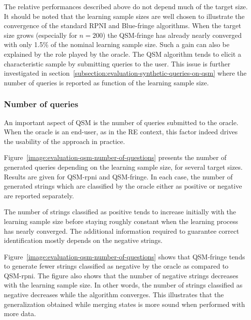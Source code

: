 The relative performances described above do not depend much of the target size. It should be noted that the learning sample sizes are well chosen to illustrate the convergence of the standard RPNI and Blue-fringe algorithms. When the target size grows (especially for $n=200$) the QSM-fringe has already nearly converged with only 1.5\% of the nominal learning sample size. Such a gain can also be explained by the role played by the oracle. The QSM algorithm tends to elicit a characteristic sample by submitting queries to the user. This issue is further investigated in section~\ref{subsection:evaluation-synthetic-queries-on-qsm} where the number of queries is reported as function of the learning sample size.

\subsubsection*{Number of queries\label{subsection:evaluation-synthetic-queries-on-qsm}}

An important aspect of QSM is the number of queries submitted to the oracle. When the oracle is an end-user, as in the RE context, this factor indeed drives the usability of the approach in practice. 

Figure~\ref{image:evaluation-qsm-number-of-questions} presents the number of generated queries depending on the learning sample size, for several target sizes. Results are given for QSM-rpni and QSM-fringe. In each case, the number of generated strings which are classified by the oracle either as positive or negative are reported separately.

The number of strings classified as positive tends to increase initially with the learning sample size before staying roughly constant when the learning process has nearly converged. The additional information required to guarantee correct identification mostly depends on the negative strings.

Figure~\ref{image:evaluation-qsm-number-of-questions} shows that QSM-fringe tends to generate fewer strings classified as
negative by the oracle as compared to QSM-rpni. The figure also shows that the number of negative strings decreases with the learning sample size. In other words, the number of strings classified as negative decreases while the algorithm converges. This illustrates that the generalization obtained while merging states is more sound when performed with more data.


